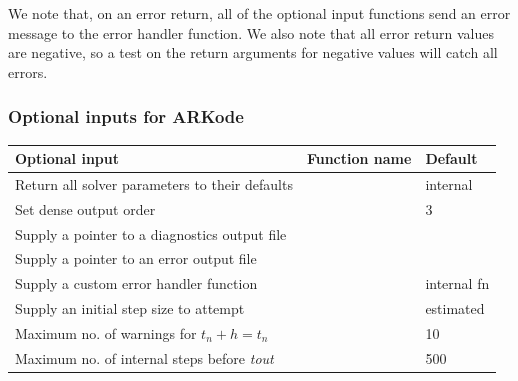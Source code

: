 \documentclass[letterpaper,10pt,english]{sphinxmanual}
\begin{document}
We note that, on an error return, all of the optional input functions
send an error message to the error handler function.  We also note
that all error return values are negative, so a test on the return
arguments for negative values will catch all errors.


\subsubsection{Optional inputs for ARKode}
\label{c_interface/User_callable:cinterface-arkodeinputtable}\label{c_interface/User_callable:optional-inputs-for-arkode}
\begin{tabulary}{\linewidth}{|L|L|L|}
\hline
\textbf{\relax 
Optional input
} & \textbf{\relax 
Function name
} & \textbf{\relax 
Default
}\\\hline

Return all solver parameters to their defaults
 & 
{\hyperref[c_interface/User_callable:ARKodeSetDefaults]{}}
 & 
internal
\\\hline

Set dense output order
 & 
{\hyperref[c_interface/User_callable:ARKodeSetDenseOrder]{}}
 & 
3
\\\hline

Supply a pointer to a diagnostics output file
 & 
{\hyperref[c_interface/User_callable:ARKodeSetDiagnostics]{}}
 & 
\\\hline

Supply a pointer to an error output file
 & 
{\hyperref[c_interface/User_callable:ARKodeSetErrFile]{}}
 & 
\\\hline

Supply a custom error handler function
 & 
{\hyperref[c_interface/User_callable:ARKodeSetErrHandlerFn]{}}
 & 
internal fn
\\\hline

Supply an initial step size to attempt
 & 
{\hyperref[c_interface/User_callable:ARKodeSetInitStep]{}}
 & 
estimated
\\\hline

Maximum no. of warnings for $t_n+h = t_n$
 & 
{\hyperref[c_interface/User_callable:ARKodeSetMaxHnilWarns]{}}
 & 
10
\\\hline

Maximum no. of internal steps before \emph{tout}
 & 
{\hyperref[c_interface/User_callable:ARKodeSetMaxNumSteps]{}}
 & 
500
\\\hline


\end{tabulary}
\end{document}
